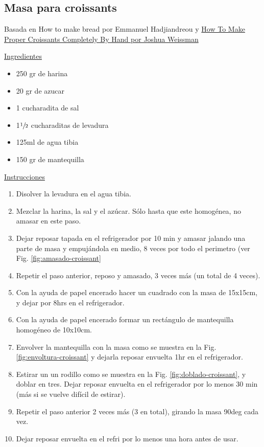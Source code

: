 \subsection{Masa para croissants}

Basada en How to make bread por Emmanuel Hadjiandreou y \href{https://www.youtube.com/watch?v=hJxaVD6eAtc}{How To Make Proper Croissants Completely By Hand por Joshua Weissman}

\underline{Ingredientes}

\begin{itemize}
\item 250 gr de harina
\item 20 gr de azucar
\item 1 cucharadita de sal
\item 1$\sfrac{1}{2}$ cucharaditas de levadura
\item 125ml de agua tibia
\item 150 gr de mantequilla
\end{itemize}

\underline{Instrucciones}

\begin{enumerate}
\item Disolver la levadura en el agua tibia.
\item Mezclar la harina, la sal y el azúcar. Sólo hasta que este homogénea, no amasar en este paso.
\item Dejar reposar tapada en el refrigerador por 10 min y amasar jalando una parte de masa y empujándola en medio, 8 veces por todo el perimetro (ver Fig. \ref{fig:amasado-croissant}
\item Repetir el paso anterior, reposo y amasado, 3 veces más (un total de 4 veces).
\item Con la ayuda de papel encerado hacer un cuadrado con la masa de \Sim 15x15cm, y dejar por \Sim 8hrs en el refrigerador.
\item Con la ayuda de papel encerado formar un rectángulo de mantequilla homogéneo de \Sim 10x10cm.
\item Envolver la mantequilla con la masa como se muestra en la Fig. \ref{fig:envoltura-croissant} y dejarla reposar envuelta 1hr en el refrigerador.
\item Estirar un un rodillo como se muestra en la Fig. \ref{fig:doblado-croissant}, y doblar en tres. Dejar reposar envuelta en el refrigerador por lo menos 30 min (más si se vuelve difícil de estirar).
\item Repetir el paso anterior 2 veces más (3 en total), girando la masa 90deg cada vez.
\item Dejar reposar envuelta en el refri por lo menos una hora antes de usar. 
\end{enumerate}

